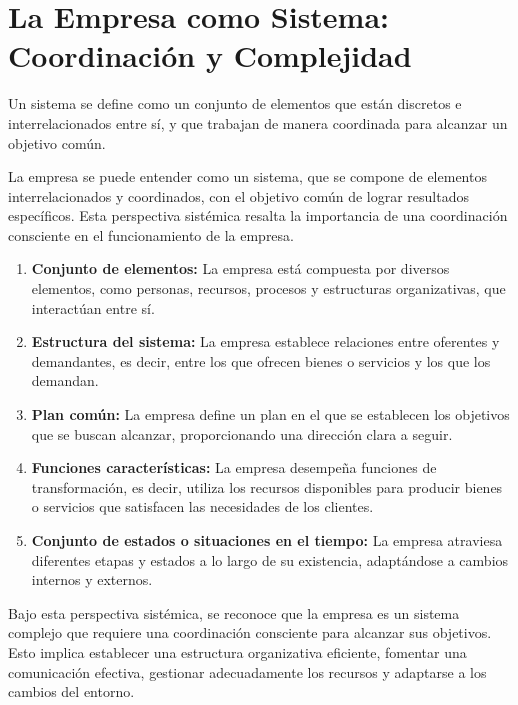 \documentclass[
  letterpaper,
  DIV=11,
  numbers=noendperiod]{scrartcl}
\begin{document}
\hypertarget{la-empresa-como-sistema-coordinaciuxf3n-y-complejidad}{%
\section{La Empresa como Sistema: Coordinación y
Complejidad}\label{la-empresa-como-sistema-coordinaciuxf3n-y-complejidad}}

Un sistema se define como un conjunto de elementos que están discretos e
interrelacionados entre sí, y que trabajan de manera coordinada para
alcanzar un objetivo común.

La empresa se puede entender como un sistema, que se compone de
elementos interrelacionados y coordinados, con el objetivo común de
lograr resultados específicos. Esta perspectiva sistémica resalta la
importancia de una coordinación consciente en el funcionamiento de la
empresa.

\begin{enumerate}
\def\labelenumi{\arabic{enumi}.}
\item
  \textbf{Conjunto de elementos:} La empresa está compuesta por diversos
  elementos, como personas, recursos, procesos y estructuras
  organizativas, que interactúan entre sí.
\item
  \textbf{Estructura del sistema:} La empresa establece relaciones entre
  oferentes y demandantes, es decir, entre los que ofrecen bienes o
  servicios y los que los demandan.
\item
  \textbf{Plan común:} La empresa define un plan en el que se establecen
  los objetivos que se buscan alcanzar, proporcionando una dirección
  clara a seguir.
\item
  \textbf{Funciones características:} La empresa desempeña funciones de
  transformación, es decir, utiliza los recursos disponibles para
  producir bienes o servicios que satisfacen las necesidades de los
  clientes.
\item
  \textbf{Conjunto de estados o situaciones en el tiempo:} La empresa
  atraviesa diferentes etapas y estados a lo largo de su existencia,
  adaptándose a cambios internos y externos.
\end{enumerate}

Bajo esta perspectiva sistémica, se reconoce que la empresa es un
sistema complejo que requiere una coordinación consciente para alcanzar
sus objetivos. Esto implica establecer una estructura organizativa
eficiente, fomentar una comunicación efectiva, gestionar adecuadamente
los recursos y adaptarse a los cambios del entorno.
\end{document}
